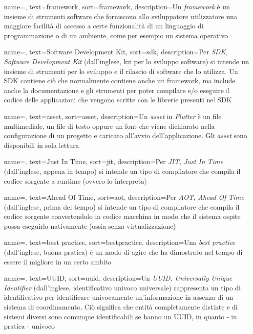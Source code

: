 {
    name=,
    text=framework,
    sort=framework,
    description={Un \emph{framework} è un insieme di strumenti software che forniscono allo sviluppatore utilizzatore una maggiore facilità di accesso a certe funzionalità di un linguaggio di programmazione o di un ambiente, come per esempio un sistema operativo}
}

{
    name=,
    text=Software Development Kit,
    sort=sdk,
    description={Per \emph{SDK, Software Development Kit} (dall'inglese, kit per lo sviluppo software) si intende un insieme di strumenti per lo sviluppo e il rilascio di software che lo utilizza. Un SDK contiene ciò che normalmente contiene anche un framework, ma include anche la documentazione e gli strumenti per poter compilare e/o eseguire il codice delle applicazioni che vengono scritte con le librerie presenti nel SDK}
}

{
    name=,
    text=asset,
    sort=asset,
    description={Un \emph{asset} in \emph{Flutter} è un file multimediale, un file di testo oppure un font che viene dichiarato nella configurazione di un progetto e caricato all'avvio dell'applicazione. Gli \emph{asset} sono disponibili in sola lettura}
}

{
    name=,
    text=Just In Time,
    sort=jit,
    description={Per \emph{JIT, Just In Time} (dall'inglese, appena in tempo) si intende un tipo di compilatore che compila il codice sorgente a runtime (ovvero lo interpreta)}
}

{
    name=,
    text=Ahead Of Time,
    sort=aot,
    description={Per \emph{AOT, Ahead Of Time} (dall'inglese, prima del tempo) si intende un tipo di compilatore che compila il codice sorgente convertendolo in codice macchina in modo che il sistema ospite possa eseguirlo nativamente (ossia senza virtualizzazione)}
}

{
    name=,
    text=best practice,
    sort=bestpractice,
    description={Una \emph{best practice} (dall'inglese, buona pratica) è un modo di agire che ha dimostrato nel tempo di essere il migliore in un certo ambito}
}

{
    name=,
    text=UUID,
    sort=uuid,
    description={Un \emph{UUID, Universally Unique Identifier} (dall'inglese, identificativo univoco universale) rappresenta un tipo di identificativo per identificare univocamente un'informazione in assenza di un sistema di coordinamento. Ciò significa che entità completamente distinte e di sistemi diversi sono comunque identificabili se hanno un UUID, in quanto - in pratica - univoco}
}

